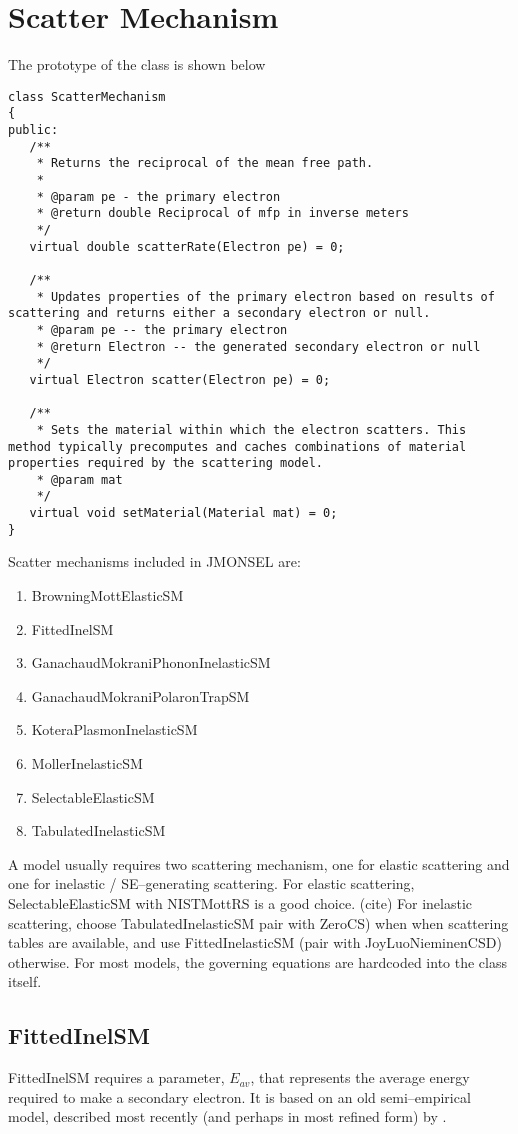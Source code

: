 \section{Scatter Mechanism}\label{impl:sm}
The prototype of the class is shown below
\begin{lstlisting}
class ScatterMechanism
{
public:
   /**
    * Returns the reciprocal of the mean free path.
    *
    * @param pe - the primary electron
    * @return double Reciprocal of mfp in inverse meters
    */
   virtual double scatterRate(Electron pe) = 0;

   /**
    * Updates properties of the primary electron based on results of scattering and returns either a secondary electron or null.
    * @param pe -- the primary electron
    * @return Electron -- the generated secondary electron or null
    */
   virtual Electron scatter(Electron pe) = 0;

   /**
    * Sets the material within which the electron scatters. This method typically precomputes and caches combinations of material properties required by the scattering model.
    * @param mat
    */
   virtual void setMaterial(Material mat) = 0;
}
\end{lstlisting}

Scatter mechanisms included in JMONSEL are:
\begin{enumerate}
\item BrowningMottElasticSM
\item FittedInelSM
\item GanachaudMokraniPhononInelasticSM
\item GanachaudMokraniPolaronTrapSM
\item KoteraPlasmonInelasticSM
\item MollerInelasticSM
\item SelectableElasticSM
\item TabulatedInelasticSM
\end{enumerate}

A model usually requires two scattering mechanism, one for elastic scattering and one for inelastic / SE--generating scattering. For elastic scattering, SelectableElasticSM with NISTMottRS is a good choice. (cite) For inelastic scattering, choose TabulatedInelasticSM pair with ZeroCS) when when scattering tables are available, and use FittedInelasticSM (pair with JoyLuoNieminenCSD) otherwise. For most models, the governing equations are hardcoded into the class itself. 

\subsection{FittedInelSM}
FittedInelSM requires a parameter, $E_{av}$, that represents the average energy required to make a secondary electron. It is based on an old semi--empirical model, described most recently (and perhaps in most refined form) by \cite{lin2005new}.

